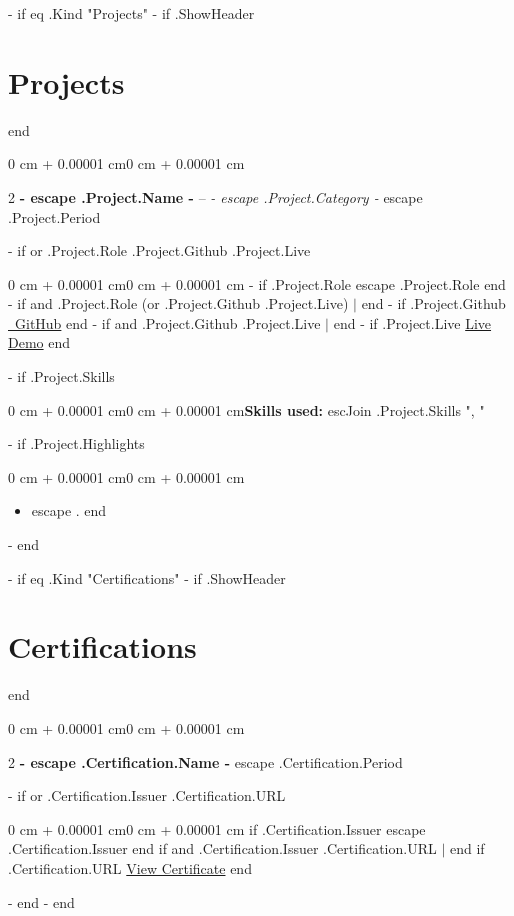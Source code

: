 \documentclass[10pt, letterpaper]{article}
\newenvironment{highlights}{\begin{itemize}[topsep=0.10 cm,parsep=0.10 cm,partopsep=0pt,itemsep=0pt,leftmargin=0 cm + 10pt]}{\end{itemize}}
\newenvironment{onecolentry}{\begin{adjustwidth}{0 cm + 0.00001 cm}{0 cm + 0.00001 cm}}{\end{adjustwidth}}
\newenvironment{twocolentry}[2][]{\onecolentry\def\secondColumn{#2}\setcolumnwidth{\fill, 4.5 cm}\begin{paracol}{2}}{\switchcolumn \raggedleft \secondColumn\end{paracol}\endonecolentry}
\begin{document}
        {{- if eq .Kind "Projects" }}
            {{- if .ShowHeader }}\section{Projects}{{ end }}
            \begin{twocolentry}{
                {{ escape .Project.Period }}
            }
                \textbf{ {{- escape .Project.Name -}} } -- \textit{ {{- escape .Project.Category -}} }\end{twocolentry}
            {{- if or .Project.Role .Project.Github .Project.Live }}\vspace{0.10 cm}
            \begin{onecolentry}
                {{- if .Project.Role }}{{ escape .Project.Role }}{{ end }}
                {{- if and .Project.Role (or .Project.Github .Project.Live) }} $|$ {{ end }}
                {{- if .Project.Github }}\href{ {{ .Project.Github }} }{\faGithub\ GitHub}{{ end }}
                {{- if and .Project.Github .Project.Live }} $|$ {{ end }}
                {{- if .Project.Live }}\href{ {{ .Project.Live }} }{Live Demo}{{ end }}
            \end{onecolentry}{{ end }}
            {{- if .Project.Skills }}\vspace{0.10 cm}\begin{onecolentry}\textbf{Skills used:} {{ escJoin .Project.Skills ", " }}\end{onecolentry}{{ end }}
            {{- if .Project.Highlights }}\vspace{0.10 cm}\begin{onecolentry}\begin{highlights}{{ range .Project.Highlights }}\item {{ escape . }}{{ end }}\end{highlights}\end{onecolentry}{{ end }}
            \vspace{0.2 cm}
        {{- end }}

        {{- if eq .Kind "Certifications" }}
            {{- if .ShowHeader }}\section{Certifications}{{ end }}
            \begin{twocolentry}{
                {{ escape .Certification.Period }}
            }
                \textbf{ {{- escape .Certification.Name -}} }\end{twocolentry}
            {{- if or .Certification.Issuer .Certification.URL }}\vspace{0.10 cm}\begin{onecolentry}{{ if .Certification.Issuer }}{{ escape .Certification.Issuer }}{{ end }} {{ if and .Certification.Issuer .Certification.URL }} $|$ {{ end }} {{ if .Certification.URL }}\href{ {{ .Certification.URL }} }{View Certificate}{{ end }}\end{onecolentry}{{ end }}
            \vspace{0.2 cm}
        {{- end }}
    {{- end }}
\end{document}
